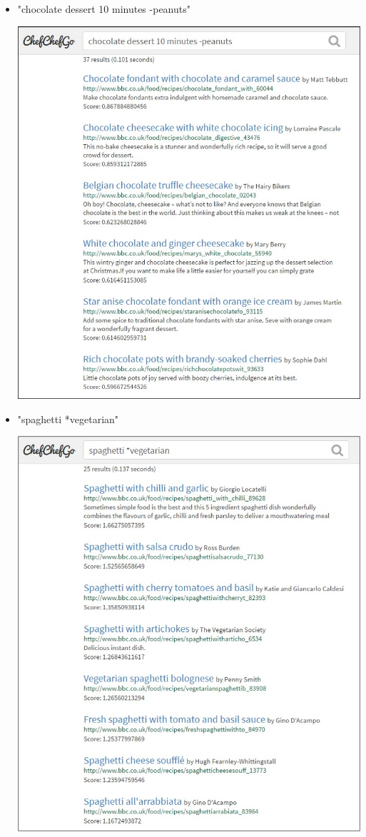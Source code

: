 \begin{itemize}
	\item "chocolate dessert 10 minutes -peanuts"
	\begin{center}
		\includegraphics[scale = 0.5]{img/query3.jpg}
	\end{center}
	
	\item "spaghetti *vegetarian"
	\begin{center}
		\includegraphics[scale = 0.5]{img/query4.jpg}
	\end{center}
	

\end{itemize}

